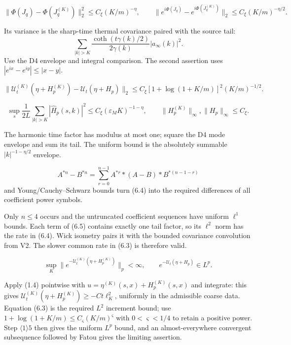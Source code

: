 \documentclass[11pt,a4paper]{article}
\newcommand{\eps}{\varepsilon}
\newcommand{\U}{\mathcal U}
\DeclareMathOperator{\cth}{coth}
\begin{document}
\[
 \|\Phi(J_q)-\Phi(J_q^{(K)})\|_2^2
 \le C_\xi(K/m)^{-\eta},\qquad
 \|e^{i\Phi(J_q)}-e^{i\Phi(J_q^{(K)})}\|_2
 \le C_\xi(K/m)^{-\eta/2}.
\tag{6.2}
\]

\Because Its variance is the sharp-time thermal covariance paired with the source
tail:
\[
 \sum_{|k|>K}\frac{\cth(t\gamma(k)/2)}{2\gamma(k)}
 |a_\infty(k)|^2.
\]
Use the D4 envelope and integral comparison.  The second assertion uses
$|e^{ix}-e^{iy}|\le|x-y|$.

\[
 \|\U_t^{(K)}(\eta+H_p^{(K)})-
 \U_t(\eta+H_p)\|_2
 \le C_\xi[1+\log(1+K/m)]^2(K/m)^{-1/2}.
\tag{6.3}
\]



\[
 \sup_s\frac1{2L}\sum_{|k|>K}|\widehat H_p(s,k)|^2
 \le C_\xi(\eps_MK)^{-1-\eta},\qquad
 \|H_p^{(K)}\|_\infty,\|H_p\|_\infty\le C_\xi.
\tag{6.4}
\]

\Because The harmonic time factor has modulus at most one; square the D4 mode
envelope and sum its tail.  The uniform bound is the absolutely summable
$|k|^{-1-\eta/2}$ envelope.

\[
 A^{*n}-B^{*n}=\sum_{r=0}^{n-1}A^{*r}*(A-B)*B^{*(n-1-r)}
\tag{6.5}
\]
and Young/Cauchy--Schwarz bounds turn (6.4) into the required differences of all
coefficient power symbols.

\Because Only $n\le4$ occurs and the untruncated coefficient sequences have
uniform $\ell^1$ bounds.  Each term of (6.5) contains exactly one tail factor,
so its $\ell^2$ norm has the rate in (6.4).  Wick isometry pairs it with the
bounded covariance convolution from V2.  The slower common rate in (6.3) is
therefore valid.

\[
 \sup_K\|e^{-\U_t^{(K)}(\eta+H_p^{(K)})}\|_p<\infty,\qquad
 e^{-\U_t(\eta+H_p)}\in L^p.
\tag{6.6}
\]

\Because Apply (1.4) pointwise with
$u=\eta^{(K)}(s,x)+H_p^{(K)}(s,x)$ and integrate: this gives
$\U_t^{(K)}(\eta+H_p^{(K)})\ge-Ct\ell_K^2$, uniformly in the admissible coarse
data.  Equation (6.3) is the required $L^2$ increment bound; use
$1+\log(1+K/m)\le C_\varsigma(K/m)^\varsigma$ with
$0<\varsigma<1/4$ to retain a positive power.  Step $\langle1\rangle5$ then gives
the uniform $L^p$ bound, and an almost-everywhere convergent subsequence followed by
Fatou gives the limiting assertion.
\end{document}
